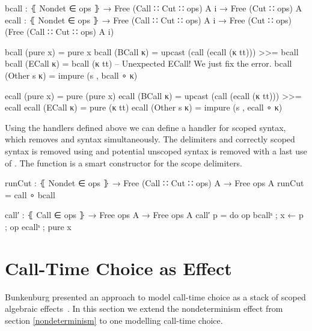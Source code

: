 \begin{code}
bcall  : ⦃ Nondet ∈ ops ⦄ → Free (Call ∷ Cut ∷ ops) A {i} → Free (Cut ∷ ops) A
ecall  : ⦃ Nondet ∈ ops ⦄ → Free (Call ∷ Cut ∷ ops) A {i}
  → Free (Cut ∷ ops) (Free (Call ∷ Cut ∷ ops) A {i})

bcall (pure x)     = pure x
bcall (BCall κ)    = upcast (call (ecall (κ tt))) >>= bcall
bcall (ECall κ)    = bcall (κ tt) -- Unexpected ECall! We just fix the error.
bcall (Other s κ)  = impure (s , bcall ∘ κ)

ecall (pure x)     = pure (pure x)
ecall (BCall κ)    = upcast (call (ecall (κ tt))) >>= ecall
ecall (ECall κ)    = pure (κ tt)
ecall (Other s κ)  = impure (s , ecall ∘ κ)
\end{code}
Using the handlers defined above we can define a handler for scoped
 syntax, which removes  and
 syntax simultaneously.
The delimiters and correctly scoped  syntax is removed using
 and potential unscoped  syntax is
removed with a last use of .
The function  is a smart constructor for the scope
delimiters.

\begin{code}
runCut : ⦃ Nondet ∈ ops ⦄ → Free (Call ∷ Cut ∷ ops) A → Free ops A
runCut = call ∘ bcall

call′ : ⦃ Call ∈ ops ⦄ → Free ops A → Free ops A
call′ p = do op bcallˢ ; x ← p ; op ecallˢ ; pure x
\end{code}

\section{Call-Time Choice as Effect}

Bunkenburg presented an approach to model call-time choice as a stack of
scoped algebraic effects~\cite{bunkenburg2019modeling}.
In this section we extend the nondeterminism effect from section
\ref{nondeterminism} to one modelling call-time choice.

